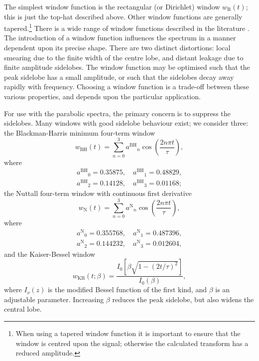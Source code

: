 \documentclass[useAMS,usedcolumn,usegraphicx,usenatbib]{mn2e}
\newcommand{\sub}[1]{\ensuremath{_\mathrm{#1}}}
\newcommand{\super}[1]{\ensuremath{^\mathrm{#1}}}
\begin{document}
The simplest window function is the rectangular (or Dirichlet) window $w\sub{R}(t)$; this is just the top-hat described above. Other window functions are generally tapered.\footnote{When using a tapered window function it is important to ensure that the window is centred upon the signal; otherwise the calculated transform has a reduced amplitude.} There is a wide range of window functions described in the literature \citep*{Harris1978,Kaiser1980,Nuttall1981,McKechan2010}. The introduction of a window function influences the spectrum in a manner dependent upon its precise shape. There are two distinct distortions: local smearing due to the finite width of the centre lobe, and distant leakage due to finite amplitude sidelobes. The window function may be optimised such that the peak sidelobe has a small amplitude, or such that the sidelobes decay away rapidly with frequency. Choosing a window function is a trade-off between these various properties, and depends upon the particular application.

For use with the parabolic spectra, the primary concern is to suppress the sidelobes. Many windows with good sidelobe behaviour exist; we consider three: the Blackman-Harris minimum four-term window \citep{Harris1978, Nuttall1981}
\begin{equation}
w\sub{BH}(t) = \sum_{n=0}^{3} a\super{BH}_n\cos\left(\frac{2n\pi t}{\tau}\right),
\end{equation}
where
\begin{equation}
\begin{split}
a\super{BH}_0 = 0.35875, \quad a\super{BH}_1 = 0.48829,\\
a\super{BH}_2 = 0.14128, \quad a\super{BH}_3 = 0.01168;
\end{split}
\end{equation}
the Nuttall four-term window with continuous first derivative \citep{Nuttall1981}
\begin{equation}
w\sub{N}(t) = \sum_{n=0}^{3} a\super{N}_n\cos\left(\frac{2n\pi t}{\tau}\right),
\end{equation}
where
\begin{equation}
\begin{split}
a\super{N}_0 = 0.355768, \quad a\super{N}_1 = 0.487396,\\
a\super{N}_2 = 0.144232, \quad a\super{N}_3 = 0.012604,
\end{split}
\end{equation}
and the Kaiser-Bessel window \citep{Harris1978, Kaiser1980}
\begin{equation}
w\sub{KB}(t;\beta) = \frac{I_0\left[\beta\sqrt{1 - (2 t/\tau)^2}\right]}{I_0(\beta)},
\end{equation}
where $I_\nu(z)$ is the modified Bessel function of the first kind, and $\beta$ is an adjustable parameter. Increasing $\beta$ reduces the peak sidelobe, but also widens the central lobe.
\end{document}
